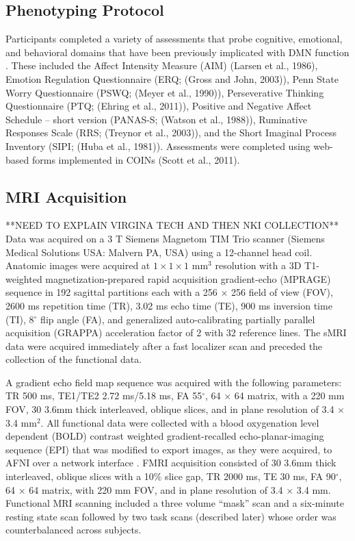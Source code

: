 \subsection{Phenotyping Protocol}
Participants completed a variety of assessments that probe cognitive, emotional, and behavioral domains that have been previously implicated with DMN function \cite{Andrews_Hanna_2014,Buckner2008,Hamilton2011,Sheline2009}. These included the Affect Intensity Measure (AIM) (Larsen et al., 1986), Emotion Regulation Questionnaire (ERQ; (Gross and John, 2003)), Penn State Worry Questionnaire (PSWQ; (Meyer et al., 1990)), Perseverative Thinking Questionnaire (PTQ; (Ehring et al., 2011)), Positive and Negative Affect Schedule -- short version (PANAS-S; (Watson et al., 1988)), Ruminative Responses Scale (RRS; (Treynor et al., 2003)), and the Short Imaginal Process Inventory (SIPI; (Huba et al., 1981)). Assessments were completed using web-based forms implemented in COINs (Scott et al., 2011). 

\subsection{MRI Acquisition}
**NEED TO EXPLAIN VIRGINA TECH AND THEN NKI COLLECTION**
Data was acquired on a 3 T Siemens Magnetom TIM Trio scanner (Siemens Medical Solutions USA: Malvern PA, USA) using a 12-channel head coil. Anatomic images were acquired at $1 \times 1 \times 1$ mm$^{3}$ resolution with a 3D T1-weighted magnetization-prepared rapid acquisition gradient-echo (MPRAGE) sequence \cite{Mugler_1990} in 192 sagittal partitions each with a 256 $\times$ 256 field of view (FOV), 2600 ms repetition time (TR), 3.02 ms echo time (TE), 900 ms inversion time (TI), 8$^\circ$ flip angle (FA), and generalized auto-calibrating partially parallel acquisition (GRAPPA) \cite{Griswold_2002} acceleration factor of 2 with 32 reference lines. The sMRI data were acquired immediately after a fast localizer scan and preceded the collection of the functional data. 

A gradient echo field map sequence was acquired with the following parameters: TR 500 ms, TE1/TE2 2.72 ms/5.18 ms, FA 55$^\circ$, 64 $\times$ 64 matrix, with a 220 mm FOV, 30 3.6mm thick interleaved, oblique slices, and in plane resolution of 3.4 $\times$ 3.4 mm$^{2}$. All functional data were collected with a blood oxygenation level dependent (BOLD) contrast weighted gradient-recalled echo-planar-imaging sequence (EPI) that was modified to export images, as they were acquired, to AFNI over a network interface \cite{Cox_1995,Cox_1996,LaConte_2007}. FMRI acquisition consisted of 30 3.6mm thick interleaved, oblique slices with a 10\% slice gap, TR 2000 ms, TE 30 ms, FA 90$^\circ$, 64 $\times$ 64 matrix, with 220 mm FOV, and in plane resolution of 3.4 $\times$ 3.4 mm. Functional MRI scanning included a three volume ``mask'' scan and a six-minute resting state scan followed by two task scans (described later) whose order was counterbalanced across subjects.

